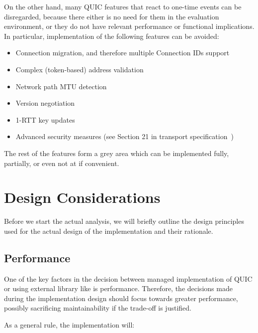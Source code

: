 On the other hand, many QUIC features that react to one-time events can be disregarded, because
there either is no need for them in the evaluation environment, or they do not have relevant
performance or functional implications. In particular, implementation of the following features can
be avoided:

\begin{itemize}

    \item Connection migration, and therefore multiple Connection IDs support

    \item Complex (token-based) address validation

    \item Network path MTU detection

    \item Version negotiation

    \item 1-RTT key updates

    \item Advanced security measures (see Section 21 in transport specification~\cite{draft-ietf-quic-transport})

\end{itemize}

The rest of the features form a grey area which can be implemented fully, partially, or even not at
if convenient.

\section{Design Considerations}

Before we start the actual analysis, we will briefly outline the design principles used for the
actual design of the implementation and their rationale.

\subsection{Performance}

One of the key factors in the decision between managed \dotnet{} implementation of QUIC or using
external library like \libmsquic{} is performance. Therefore, the decisions made during the
implementation design should focus towards greater performance, possibly sacrificing maintainability
if the trade-off is justified.

As a general rule, the implementation will:

